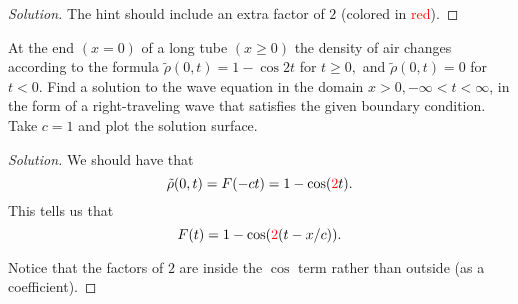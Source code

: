 \documentclass[11pt]{article}
\newenvironment{solution}
  {\renewcommand\qedsymbol{$\blacksquare$}\begin{proof}[Solution]}
  {\end{proof}}
\begin{document}
\begin{solution}
The hint should include an extra factor of $2$ (colored in \textcolor{red}{red}).
\end{solution}

\begin{exercise}{8}
  At the end $(x = 0)$ of a long tube $(x \geq 0)$ the density of air changes according to the formula $\tilde{\rho}(0,t) = 1 - \cos 2t$ for $t \geq 0,$ 
  and $\tilde{\rho}(0,t) = 0$ for $t < 0$. Find a solution to the wave equation in the domain $x>0, -\infty<t< \infty$, in the form of a 
  right-traveling wave that satisfies the given boundary condition. Take $c = 1$ and plot the solution surface.
\end{exercise}

\begin{solution}
We should have that \[\tilde{\rho}(0,t) = F(-ct) = 1- \cos(\textcolor{red}{2}t).\] This tells us that \[F(t) = 1-\cos(\textcolor{red}{2}(t - x/c)). \]

Notice that the factors of $2$ are inside the $\cos$ term rather than outside (as a coefficient).
\end{solution}
\end{document}

